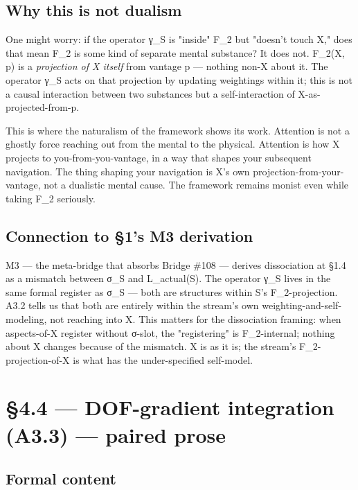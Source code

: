 \documentclass[11pt, openany]{book}
\newcommand{\sectionbreak}{\clearpage}
\begin{document}
\subsection{Why this is not dualism}

One might worry: if the operator γ\_\allowbreak{}S is "inside" F\_\allowbreak{}2 but "doesn't touch X," does that mean F\_\allowbreak{}2 is some kind of separate mental substance? It does not. F\_\allowbreak{}2(X, p) is a \textit{projection of X itself} from vantage p --- nothing non-X about it. The operator γ\_\allowbreak{}S acts on that projection by updating weightings within it; this is not a causal interaction between two substances but a self-interaction of X-as-projected-from-p.

This is where the naturalism of the framework shows its work. Attention is not a ghostly force reaching out from the mental to the physical. Attention is how X projects to you-from-you-vantage, in a way that shapes your subsequent navigation. The thing shaping your navigation is X's own projection-from-your-vantage, not a dualistic mental cause. The framework remains monist even while taking F\_\allowbreak{}2 seriously.

\subsection{Connection to §1's M3 derivation}

M3 --- the meta-bridge that absorbs Bridge \#108 --- derives dissociation at §1.4 as a mismatch between σ\_\allowbreak{}S and L\_\allowbreak{}actual(S). The operator γ\_\allowbreak{}S lives in the same formal register as σ\_\allowbreak{}S --- both are structures within S's F\_\allowbreak{}2-projection. A3.2 tells us that both are entirely within the stream's own weighting-and-self-modeling, not reaching into X. This matters for the dissociation framing: when aspects-of-X register without σ-slot, the "registering" is F\_\allowbreak{}2-internal; nothing about X changes because of the mismatch. X is as it is; the stream's F\_\allowbreak{}2-projection-of-X is what has the under-specified self-model.

\sectionbreak

\section{§4.4 --- DOF-gradient integration (A3.3) --- paired prose}

\subsection{Formal content}
\end{document}
